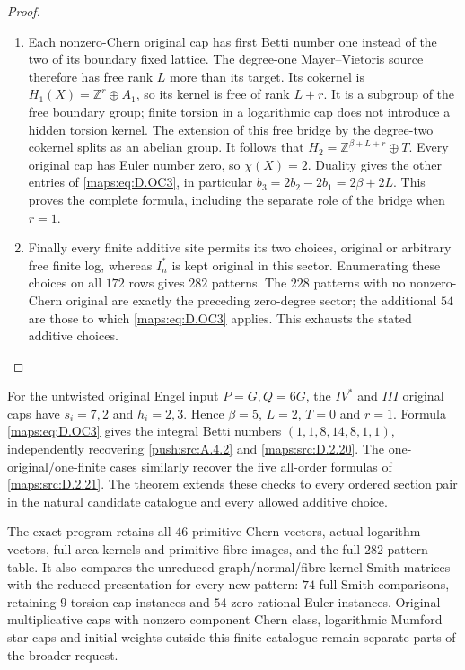 \begin{proof}
\begin{enumerate}[label=\arabic*.,leftmargin=*]
\item Each nonzero-Chern original cap has first Betti number
one instead of the two of its boundary fixed lattice.
The degree-one Mayer--Vietoris source therefore has free
rank $L$ more than its target. Its cokernel is
$H_1(X)=\mathbb Z^r\oplus A_1$, so its kernel is free of
rank $L+r$. It is a subgroup of the free boundary group;
finite torsion in a logarithmic cap does not introduce a
hidden torsion kernel. The extension of this free bridge
by the degree-two cokernel splits as an abelian group.
It follows that
$H_2=\mathbb Z^{\beta+L+r}\oplus T$.
Every original cap has Euler number zero, so $\chi(X)=2$.
Duality gives the other entries of \eqref{maps:eq:D.OC3}, in particular
$b_3=2b_2-2b_1=2\beta+2L$.
This proves the complete formula, including the separate
role of the bridge when $r=1$.

\item Finally every finite additive site permits its two choices,
original or arbitrary free finite log, whereas $I_n^*$ is
kept original in this sector. Enumerating these choices
on all $172$ rows gives $282$ patterns. The $228$ patterns
with no nonzero-Chern original are exactly the preceding
zero-degree sector; the additional $54$ are those to which
\eqref{maps:eq:D.OC3} applies. This exhausts the stated additive choices.
\end{enumerate}
\end{proof}

For the untwisted original Engel input $P=G,Q=6G$, the
$IV^*$ and $III$ original caps have $s_i=7,2$ and
$h_i=2,3$. Hence $\beta=5$, $L=2$, $T=0$ and $r=1$.
Formula \eqref{maps:eq:D.OC3} gives the integral Betti numbers
$(1,1,8,14,8,1,1)$, independently recovering \cref{push:src:A.4.2} and
\ref{maps:src:D.2.20}. The one-original/one-finite cases similarly recover
the five all-order formulas of \ref{maps:src:D.2.21}. The theorem extends
these checks to every ordered section pair in the natural
candidate catalogue and every allowed additive choice.

The exact program 
retains all $46$ primitive Chern vectors, actual logarithm
vectors, full area kernels and primitive fibre images,
and the full $282$-pattern table. It also compares the
unreduced graph/normal/fibre-kernel Smith matrices with
the reduced presentation for every new pattern: $74$ full
Smith comparisons, retaining $9$ torsion-cap instances and
$54$ zero-rational-Euler instances. Original multiplicative caps with nonzero
component Chern class, logarithmic Mumford star caps and
initial weights outside this finite catalogue remain
separate parts of the broader request.


